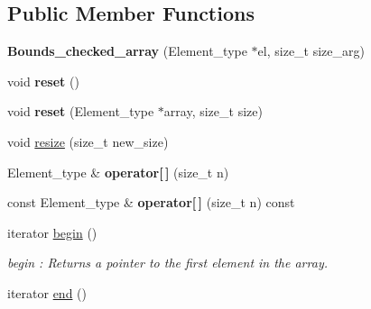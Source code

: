 \subsection*{Public Member Functions}
\begin{DoxyCompactItemize}
\item 
\mbox{\label{classBounds__checked__array_a59f0e695b4acb0c96da514bc95960765}} 
{\bfseries Bounds\+\_\+checked\+\_\+array} (Element\+\_\+type $\ast$el, size\+\_\+t size\+\_\+arg)
\item 
\mbox{\label{classBounds__checked__array_ac140f33acb6661980bf3bff191ac467f}} 
void {\bfseries reset} ()
\item 
\mbox{\label{classBounds__checked__array_ae83c2dba22d744862bf31ee1ce33edd0}} 
void {\bfseries reset} (Element\+\_\+type $\ast$array, size\+\_\+t size)
\item 
void \mbox{\hyperlink{classBounds__checked__array_a53fc15030e185de8272bfe0dc130ae11}{resize}} (size\+\_\+t new\+\_\+size)
\item 
\mbox{\label{classBounds__checked__array_a1b48a3eed353e9c7ecf1485d755a43d2}} 
Element\+\_\+type \& {\bfseries operator\mbox{[}$\,$\mbox{]}} (size\+\_\+t n)
\item 
\mbox{\label{classBounds__checked__array_ad1315e15d9f0e1ccd869afd79029992a}} 
const Element\+\_\+type \& {\bfseries operator\mbox{[}$\,$\mbox{]}} (size\+\_\+t n) const
\item 
\mbox{\label{classBounds__checked__array_a5917eade4711ffab41789c26b7f69d50}} 
iterator \mbox{\hyperlink{classBounds__checked__array_a5917eade4711ffab41789c26b7f69d50}{begin}} ()
\begin{DoxyCompactList}\small\item\em begin \+: Returns a pointer to the first element in the array. \end{DoxyCompactList}\item 
\mbox{\label{classBounds__checked__array_a59b868aa4dac1332c2fa28622fa1a8db}} 
iterator \mbox{\hyperlink{classBounds__checked__array_a59b868aa4dac1332c2fa28622fa1a8db}{end}} ()

\end{DoxyCompactItemize}
